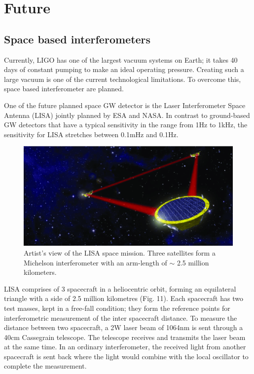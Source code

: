 \documentclass[conference]{IEEEtran}
\begin{document}
\section{Future}

\subsection{Space based interferometers}

Currently, LIGO has one of the largest vacuum systems on Earth; it takes 40 days of constant pumping to make an ideal operating pressure. Creating such a large vacuum is one of the current technological limitations. To overcome this, space based interferometer are planned.

One of the future planned space GW detector is the Laser Interferometer Space Antenna (LISA) jointly planned by ESA and NASA. In contrast to ground-based GW detectors that have a typical sensitivity in the range from 1Hz to 1kHz, the sensitivity for LISA stretches between 0.1mHz and 0.1Hz. 

\begin{figure}[htbp]
\centerline{\includegraphics[scale=0.28]{Artists-view-of-the-LISA-space-mission-Three-satellites-form-a-Michelson.png}}
\caption{Artist's view of the LISA space mission. Three satellites form a Michelson interferometer with an arm-length of $\sim$ 2.5 million kilometers\cite{phdthesis3}.}

\end{figure}

LISA comprises of 3 spacecraft in a heliocentric orbit, forming an equilateral triangle with a side of 2.5 million kilometres (Fig. 11). Each spacecraft has two test masses, kept in a free-fall condition; they form the reference points for interferometric measurement of the inter spacecraft distance. To measure the distance between two spacecraft, a 2W laser beam of 1064nm is sent through a 40cm Cassegrain telescope. The telescope receives and transmits the laser beam at the same time. In an ordinary interferometer, the received light from another spacecraft is sent back where the light would combine with the local oscillator to complete the measurement. 
\end{document}
